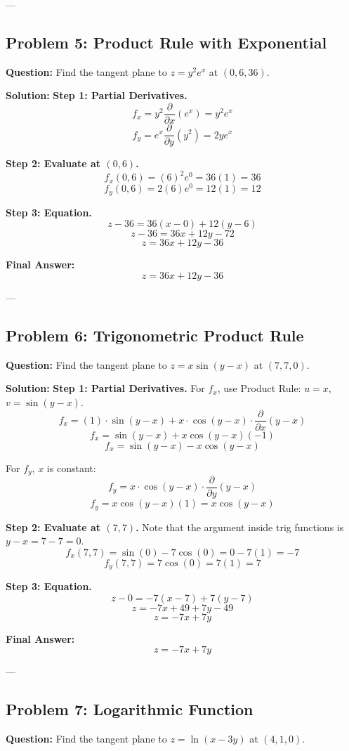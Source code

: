 \documentclass{article}
\begin{document}
---

\subsection*{Problem 5: Product Rule with Exponential}
\textbf{Question:} Find the tangent plane to $z = y^2 e^x$ at $(0, 6, 36)$.

\textbf{Solution:}
\textbf{Step 1: Partial Derivatives.}
\[ f_x = y^2 \frac{\partial}{\partial x}(e^x) = y^2 e^x \]
\[ f_y = e^x \frac{\partial}{\partial y}(y^2) = 2y e^x \]

\textbf{Step 2: Evaluate at $(0, 6)$.}
\[ f_x(0, 6) = (6)^2 e^0 = 36(1) = 36 \]
\[ f_y(0, 6) = 2(6) e^0 = 12(1) = 12 \]

\textbf{Step 3: Equation.}
\[ z - 36 = 36(x - 0) + 12(y - 6) \]
\[ z - 36 = 36x + 12y - 72 \]
\[ z = 36x + 12y - 36 \]

\textbf{Final Answer:} \[ z = 36x + 12y - 36 \]

---

\subsection*{Problem 6: Trigonometric Product Rule}
\textbf{Question:} Find the tangent plane to $z = x \sin(y - x)$ at $(7, 7, 0)$.

\textbf{Solution:}
\textbf{Step 1: Partial Derivatives.}
For $f_x$, use Product Rule: $u = x$, $v = \sin(y-x)$.
\[ f_x = (1) \cdot \sin(y-x) + x \cdot \cos(y-x) \cdot \frac{\partial}{\partial x}(y-x) \]
\[ f_x = \sin(y-x) + x \cos(y-x)(-1) \]
\[ f_x = \sin(y-x) - x \cos(y-x) \]

For $f_y$, $x$ is constant:
\[ f_y = x \cdot \cos(y-x) \cdot \frac{\partial}{\partial y}(y-x) \]
\[ f_y = x \cos(y-x)(1) = x \cos(y-x) \]

\textbf{Step 2: Evaluate at $(7, 7)$.}
Note that the argument inside trig functions is $y - x = 7 - 7 = 0$.
\[ f_x(7, 7) = \sin(0) - 7 \cos(0) = 0 - 7(1) = -7 \]
\[ f_y(7, 7) = 7 \cos(0) = 7(1) = 7 \]

\textbf{Step 3: Equation.}
\[ z - 0 = -7(x - 7) + 7(y - 7) \]
\[ z = -7x + 49 + 7y - 49 \]
\[ z = -7x + 7y \]

\textbf{Final Answer:} \[ z = -7x + 7y \]

---

\subsection*{Problem 7: Logarithmic Function}
\textbf{Question:} Find the tangent plane to $z = \ln(x - 3y)$ at $(4, 1, 0)$.
\end{document}
